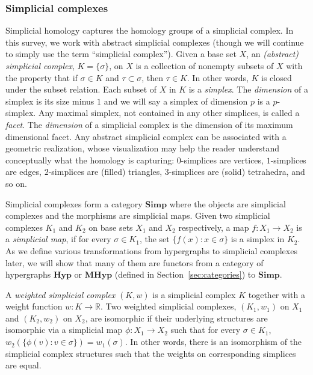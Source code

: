 \documentclass{amsart}
\newcommand{\R}{\mathbb{R}}
\newcommand{\Simp}{\mathrm{\textbf{Simp}}}
\newcommand{\Hyp}{\mathrm{\textbf{Hyp}}}
\newcommand{\MHyp}{\mathrm{\textbf{MHyp}}}
\begin{document}
\subsubsection{Simplicial complexes}
\label{sec:simplicial}
Simplicial homology captures the homology groups of a simplicial complex.
In this survey, we work with abstract simplicial complexes (though we will continue to simply use the term ``simplicial complex'').
Given a base set $X$, an \emph{(abstract) simplicial complex}, $K = \{\sigma\}$, on $X$ is a collection of nonempty subsets of $X$ with the property that if $\sigma \in K$ and $\tau \subset \sigma$, then $\tau \in K$.
In other words, $K$ is closed under the subset relation.
Each subset of $X$ in $K$ is a \emph{simplex}.
The \emph{dimension} of a simplex is its size minus $1$ and we will say a simplex of dimension $p$ is a $p$-simplex.
Any maximal simplex, not contained in any other simplices, is called a \emph{facet}.
The \emph{dimension} of a simplicial complex is the dimension of its maximum dimensional facet.
Any abstract simplicial complex can be associated with a geometric realization, whose visualization may help the reader understand conceptually what the homology is capturing:
$0$-simplices are vertices, $1$-simplices are edges, $2$-simplices are (filled) triangles, $3$-simplices are (solid) tetrahedra, and so on.

Simplicial complexes form a category $\Simp$ where the objects are simplicial complexes and the morphisms are simplicial maps. Given two simplicial complexes $K_1$ and $K_2$ on base sets $X_1$ and $X_2$ respectively, a map $f: X_1 \rightarrow X_2$ is a \emph{simplicial map}, if for every $\sigma \in K_1$, the set $\{f(x) : x \in \sigma\}$ is a simplex in $K_2$.
As we define various transformations from hypergraphs to simplicial complexes later, we will show that many of them are functors from a category of hypergraphs $\Hyp$ or $\MHyp$ (defined in Section~\ref{sec:categories}) to $\Simp$.

A \emph{weighted simplicial complex} $(K,w)$ is a simplicial complex $K$ together with a weight function $w: K \rightarrow \R$.
Two weighted simplicial complexes, $(K_1, w_1)$ on $X_1$ and $(K_2, w_2)$ on $X_2$, are isomorphic if their underlying structures are isomorphic via a simplicial map $\phi : X_1 \rightarrow X_2$ such that for every $\sigma \in K_1$, $w_2(\{\phi(v) : v \in \sigma\}) = w_1(\sigma)$. In other words, there is an isomorphism of the simplicial complex structures such that the weights on corresponding simplices are equal.
\end{document}
